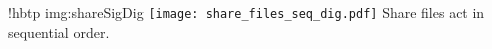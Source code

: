 \namedfigure
{!hbtp}
{img:shareSigDig}
{\texttt{[image: share\_files\_seq\_dig.pdf]}}
{Share files act in sequential order.}
